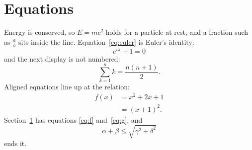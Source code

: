 \documentclass[11pt,a4paper]{article}
\begin{document}
\section{Equations}
\label{sec:eq}
Energy is conserved, so $E = mc^2$ holds for a particle at rest, and
a fraction such as $\frac{a}{b}$ sits inside the line. Equation~\eqref{eq:euler}
is Euler's identity:
\begin{equation}
  e^{i\pi} + 1 = 0
  \label{eq:euler}
\end{equation}
and the next display is not numbered:
\[
  \sum_{k=1}^{n} k = \frac{n(n+1)}{2}.
\]
Aligned equations line up at the relation:
\begin{align}
  f(x) &= x^2 + 2x + 1 \label{eq:f} \\
       &= (x+1)^2. \label{eq:g}
\end{align}
Section~\ref{sec:eq} has equations \eqref{eq:f} and~\eqref{eq:g}, and
\begin{equation*}
  \alpha + \beta \leq \sqrt{\gamma^2 + \delta^2}
\end{equation*}
ends it.
\end{document}
